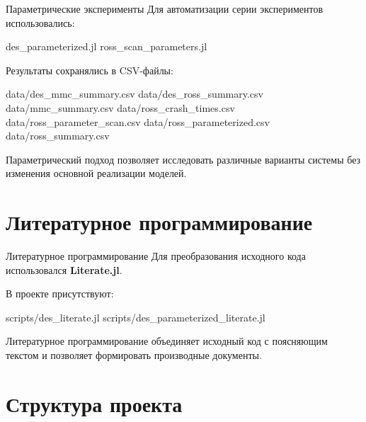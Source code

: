 \documentclass[
  ignorenonframetext,
  aspectratio=169,
  russian,
]{beamer}
\newenvironment{Shaded}{\begin{snugshade}}{\end{snugshade}}
\newcommand{\NormalTok}[1]{\textcolor[rgb]{0.00,0.23,0.31}{#1}}
\begin{document}
\begin{frame}[fragile]{Параметрические эксперименты}
Для автоматизации серии экспериментов использовались:

\begin{Shaded}
\begin{Highlighting}[]
\NormalTok{des\_parameterized.jl}
\NormalTok{ross\_scan\_parameters.jl}
\end{Highlighting}
\end{Shaded}

Результаты сохранялись в CSV-файлы:

\begin{Shaded}
\begin{Highlighting}[]
\NormalTok{data/des\_mmc\_summary.csv}
\NormalTok{data/des\_ross\_summary.csv}
\NormalTok{data/mmc\_summary.csv}
\NormalTok{data/ross\_crash\_times.csv}
\NormalTok{data/ross\_parameter\_scan.csv}
\NormalTok{data/ross\_parameterized.csv}
\NormalTok{data/ross\_summary.csv}
\end{Highlighting}
\end{Shaded}

Параметрический подход позволяет исследовать различные варианты системы
без изменения основной реализации моделей.
\end{frame}

\section{Литературное
программирование}\label{ux43bux438ux442ux435ux440ux430ux442ux443ux440ux43dux43eux435-ux43fux440ux43eux433ux440ux430ux43cux43cux438ux440ux43eux432ux430ux43dux438ux435}

\begin{frame}[fragile]{Литературное программирование}
Для преобразования исходного кода использовался \textbf{Literate.jl}.

В проекте присутствуют:

\begin{Shaded}
\begin{Highlighting}[]
\NormalTok{scripts/des\_literate.jl}
\NormalTok{scripts/des\_parameterized\_literate.jl}
\end{Highlighting}
\end{Shaded}

Литературное программирование объединяет исходный код с поясняющим
текстом и позволяет формировать производные документы.
\end{frame}

\section{Структура
проекта}\label{ux441ux442ux440ux443ux43aux442ux443ux440ux430-ux43fux440ux43eux435ux43aux442ux430}
\end{document}
